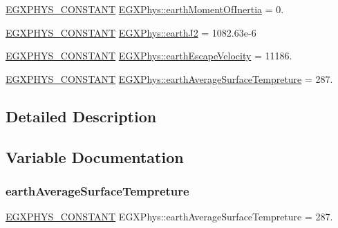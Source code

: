 \begin{DoxyCompactItemize}
\item 
\mbox{\hyperlink{group___e_g_x_phys-_constants-_macros_ga76980d288494ce1714c9ac68a95ba702}{E\+G\+X\+P\+H\+Y\+S\+\_\+\+C\+O\+N\+S\+T\+A\+NT}} \mbox{\hyperlink{group___e_g_x_phys-_constants-_astrophysics-_solar_system-_earth-_bulk_ga4b3a512e9d562530710100f65695ab13}{E\+G\+X\+Phys\+::earth\+Moment\+Of\+Inertia}} = 0.
\item 
\mbox{\hyperlink{group___e_g_x_phys-_constants-_macros_ga76980d288494ce1714c9ac68a95ba702}{E\+G\+X\+P\+H\+Y\+S\+\_\+\+C\+O\+N\+S\+T\+A\+NT}} \mbox{\hyperlink{group___e_g_x_phys-_constants-_astrophysics-_solar_system-_earth-_bulk_ga8d661a52948229a59e9eabf97af51faf}{E\+G\+X\+Phys\+::earth\+J2}} = 1082.\+63e-\/6
\item 
\mbox{\hyperlink{group___e_g_x_phys-_constants-_macros_ga76980d288494ce1714c9ac68a95ba702}{E\+G\+X\+P\+H\+Y\+S\+\_\+\+C\+O\+N\+S\+T\+A\+NT}} \mbox{\hyperlink{group___e_g_x_phys-_constants-_astrophysics-_solar_system-_earth-_bulk_gada6c6733f79e984d42cf37210b4ad18f}{E\+G\+X\+Phys\+::earth\+Escape\+Velocity}} = 11186.
\item 
\mbox{\hyperlink{group___e_g_x_phys-_constants-_macros_ga76980d288494ce1714c9ac68a95ba702}{E\+G\+X\+P\+H\+Y\+S\+\_\+\+C\+O\+N\+S\+T\+A\+NT}} \mbox{\hyperlink{group___e_g_x_phys-_constants-_astrophysics-_solar_system-_earth-_bulk_ga850a2031af18dbe83cafae87542b588d}{E\+G\+X\+Phys\+::earth\+Average\+Surface\+Tempreture}} = 287.
\end{DoxyCompactItemize}


\subsection{Detailed Description}


\subsection{Variable Documentation}
\mbox{\label{group___e_g_x_phys-_constants-_astrophysics-_solar_system-_earth-_bulk_ga850a2031af18dbe83cafae87542b588d}} 
\subsubsection{\texorpdfstring{earth\+Average\+Surface\+Tempreture}{earthAverageSurfaceTempreture}}
{\footnotesize\ttfamily \mbox{\hyperlink{group___e_g_x_phys-_constants-_macros_ga76980d288494ce1714c9ac68a95ba702}{E\+G\+X\+P\+H\+Y\+S\+\_\+\+C\+O\+N\+S\+T\+A\+NT}} E\+G\+X\+Phys\+::earth\+Average\+Surface\+Tempreture = 287.}

